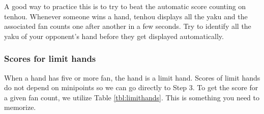 \bigskip

A good way to practice this is to try to beat the automatic score counting on {\jap tenhou}. Whenever someone wins a hand, {\jap tenhou} displays all the {\jap yaku} and the associated {\jap fan} counts one after another in a few seconds. Try to identify all the {\jap yaku} of your opponent's hand before they get displayed automatically. 

\subsubsection{Scores for limit hands} 
When a hand has five or more {\jap fan}, the hand is a limit hand. Scores of limit hands do not depend on minipoints so we can go directly to Step 3. To get the score for a given {\jap fan} count, we utilize Table \ref{tbl:limithands}. This is something you need to memorize. 

